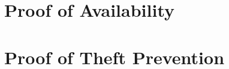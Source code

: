 \documentclass[a4paper]{article}
\theoremstyle{definition}
\begin{document}
\begin{appendices}
\section{Proof of Availability}
\section{Proof of Theft Prevention}

\end{appendices}
\end{document}
